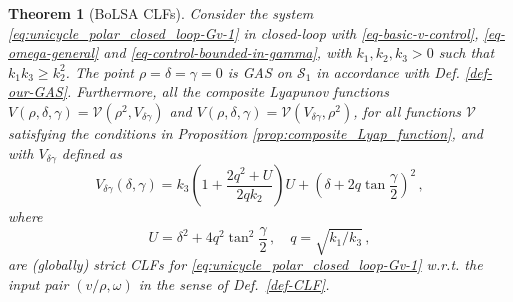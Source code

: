 \documentclass[journal,twoside,web]{ieeecolor}
\newtheorem{theorem}{Theorem}
\theoremstyle{definition}
\begin{document}
\begin{theorem}[BoLSA CLFs] 
\label{thm:unicycle_CLF_BoLSA}
Consider the system \eqref{eq:unicycle_polar_closed_loop-Gv-1} in closed-loop with \eqref{eq-basic-v-control}, \eqref{eq-omega-general} and \eqref{eq-control-bounded-in-gamma}, with  $k_1, k_2, k_3 > 0$ such that 
$k_1 k_3\geq k_2^2$.
The point $\rho = \delta = \gamma = 0$ is GAS on $\mathcal{S}_1$ in accordance with Def. \ref{def-our-GAS}.
Furthermore, all the composite Lyapunov functions $V(\rho, \delta, \gamma) = \mathcal{V}(\rho^2, V_{\delta \gamma})$ and $V(\rho, \delta, \gamma) = \mathcal{V}(V_{\delta \gamma},\rho^2)$, for all functions $\mathcal{V}$ satisfying the conditions in Proposition \ref{prop:composite_Lyap_function}, and with $V_{\delta \gamma}$ defined as
\begin{equation}
\label{eq:CLF_Bolsa_delta_gamma}
V_{\delta \gamma}(\delta, \gamma) =  k_3  \left(1+
\frac{2q^2+U}{2qk_2}\right)U
+   \left (\delta+2q\tan \frac{\gamma}{2} \right)^2\,,
\end{equation}
where
\begin{equation}
U=\delta^2+  4q^2 \tan^2\frac{\gamma}{2} \,, \quad q = \sqrt{k_1/k_3} \,, \label{eq:U_bolsa}
\end{equation} 
are (globally) strict CLFs for \eqref{eq:unicycle_polar_closed_loop-Gv-1} w.r.t. the input pair $(v/\rho,\omega)$ in the sense of Def.~\ref{def-CLF}. 
\end{theorem}
\end{document}
